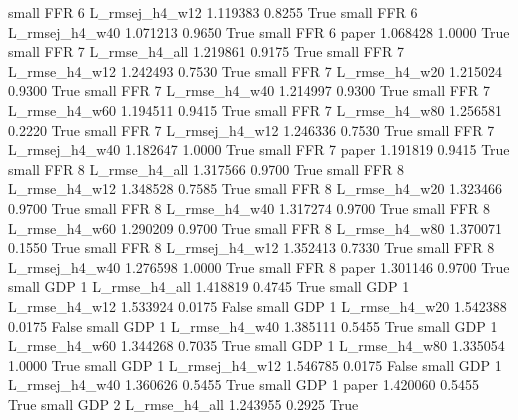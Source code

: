      small      FFR                 6 L_rmsej_h4_w12   1.119383      0.8255    True
     small      FFR                 6 L_rmsej_h4_w40   1.071213      0.9650    True
     small      FFR                 6          paper   1.068428      1.0000    True
     small      FFR                 7  L_rmse_h4_all   1.219861      0.9175    True
     small      FFR                 7  L_rmse_h4_w12   1.242493      0.7530    True
     small      FFR                 7  L_rmse_h4_w20   1.215024      0.9300    True
     small      FFR                 7  L_rmse_h4_w40   1.214997      0.9300    True
     small      FFR                 7  L_rmse_h4_w60   1.194511      0.9415    True
     small      FFR                 7  L_rmse_h4_w80   1.256581      0.2220    True
     small      FFR                 7 L_rmsej_h4_w12   1.246336      0.7530    True
     small      FFR                 7 L_rmsej_h4_w40   1.182647      1.0000    True
     small      FFR                 7          paper   1.191819      0.9415    True
     small      FFR                 8  L_rmse_h4_all   1.317566      0.9700    True
     small      FFR                 8  L_rmse_h4_w12   1.348528      0.7585    True
     small      FFR                 8  L_rmse_h4_w20   1.323466      0.9700    True
     small      FFR                 8  L_rmse_h4_w40   1.317274      0.9700    True
     small      FFR                 8  L_rmse_h4_w60   1.290209      0.9700    True
     small      FFR                 8  L_rmse_h4_w80   1.370071      0.1550    True
     small      FFR                 8 L_rmsej_h4_w12   1.352413      0.7330    True
     small      FFR                 8 L_rmsej_h4_w40   1.276598      1.0000    True
     small      FFR                 8          paper   1.301146      0.9700    True
     small      GDP                 1  L_rmse_h4_all   1.418819      0.4745    True
     small      GDP                 1  L_rmse_h4_w12   1.533924      0.0175   False
     small      GDP                 1  L_rmse_h4_w20   1.542388      0.0175   False
     small      GDP                 1  L_rmse_h4_w40   1.385111      0.5455    True
     small      GDP                 1  L_rmse_h4_w60   1.344268      0.7035    True
     small      GDP                 1  L_rmse_h4_w80   1.335054      1.0000    True
     small      GDP                 1 L_rmsej_h4_w12   1.546785      0.0175   False
     small      GDP                 1 L_rmsej_h4_w40   1.360626      0.5455    True
     small      GDP                 1          paper   1.420060      0.5455    True
     small      GDP                 2  L_rmse_h4_all   1.243955      0.2925    True

